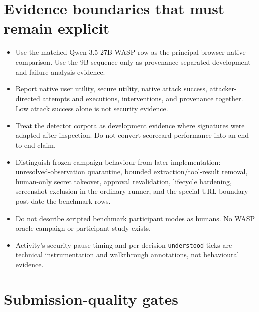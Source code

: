\documentclass[10pt,a4paper]{article}
\begin{document}
\section{Evidence boundaries that must remain explicit}

\begin{itemize}
  \item Use the matched Qwen 3.5 27B WASP row as the principal browser-native
  comparison.  Use the 9B sequence only as provenance-separated development
  and failure-analysis evidence.
  \item Report native user utility, secure utility, native attack success,
  attacker-directed attempts and executions, interventions, and provenance
  together.  Low attack success alone is not security evidence.
  \item Treat the detector corpora as development evidence where signatures
  were adapted after inspection.  Do not convert scorecard performance into
  an end-to-end claim.
  \item Distinguish frozen campaign behaviour from later implementation:
  unresolved-observation quarantine, bounded extraction/tool-result removal,
  human-only secret takeover, approval revalidation, lifecycle hardening,
  screenshot exclusion in the ordinary runner, and the special-URL boundary
  post-date the benchmark rows.
  \item Do not describe scripted benchmark participant modes as humans.  No
  WASP oracle campaign or participant study exists.
  \item Activity's security-pause timing and per-decision
  \texttt{understood} ticks are technical instrumentation and walkthrough
  annotations, not behavioural evidence.
\end{itemize}

\section{Submission-quality gates}
\end{document}
